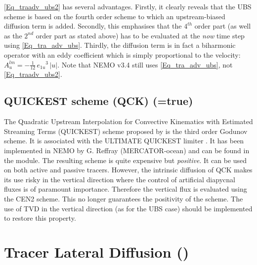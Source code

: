 \documentclass[NEMO_book]{subfiles}
\begin{document}
\eqref{Eq_traadv_ubs2} has several advantages. Firstly, it clearly reveals 
that the UBS scheme is based on the fourth order scheme to which an 
upstream-biased diffusion term is added. Secondly, this emphasises that the 
$4^{th}$ order part (as well as the $2^{nd}$ order part as stated above) has 
to be evaluated at the \emph{now} time step using \eqref{Eq_tra_adv_ubs}. 
Thirdly, the diffusion term is in fact a biharmonic operator with an eddy 
coefficient which is simply proportional to the velocity:
 $A_u^{lm}= - \frac{1}{12}\,{e_{1u}}^3\,|u|$. Note that NEMO v3.4 still uses 
 \eqref{Eq_tra_adv_ubs}, not \eqref{Eq_traadv_ubs2}.

\subsection   [QUICKEST scheme (QCK) (\np{ln\_traadv\_qck})]
			{QUICKEST scheme (QCK) (=true)}
\label{TRA_adv_qck}

The Quadratic Upstream Interpolation for Convective Kinematics with 
Estimated Streaming Terms (QUICKEST) scheme proposed by \citet{Leonard1979} 
is the third order Godunov scheme. It is associated with the ULTIMATE QUICKEST 
limiter \citep{Leonard1991}. It has been implemented in NEMO by G. Reffray 
(MERCATOR-ocean) and can be found in the  module.
The resulting scheme is quite expensive but \emph{positive}. 
It can be used on both active and passive tracers. 
However, the intrinsic diffusion of QCK makes its use risky in the vertical 
direction where the control of artificial diapycnal fluxes is of paramount importance. 
Therefore the vertical flux is evaluated using the CEN2 scheme. 
This no longer guarantees the positivity of the scheme. The use of TVD in the vertical 
direction (as for the UBS case) should be implemented to restore this property.


\section  [Tracer Lateral Diffusion (\textit{traldf})]
		{Tracer Lateral Diffusion ()}
\label{TRA_ldf}
 
\end{document}
